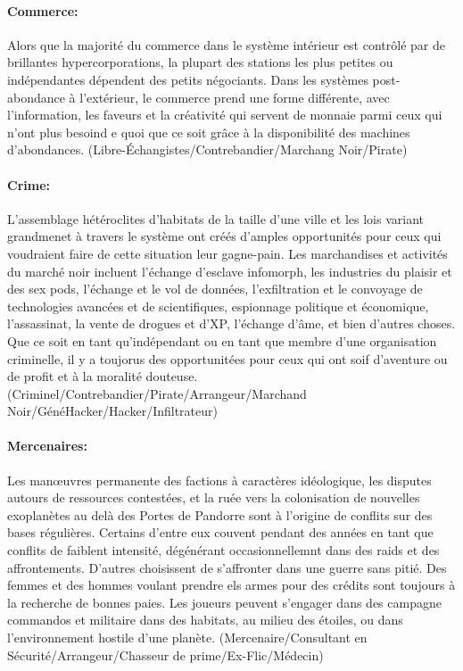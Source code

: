 \paragraph{Commerce:} Alors que la majorité du commerce dans le système intérieur est contrôlé par de brillantes hypercorporations, la plupart des stations les plus petites ou indépendantes dépendent des petits négociants. Dans les systèmes post-abondance à l'extérieur, le commerce prend une forme différente, avec l'information, les faveurs et la créativité qui servent de monnaie parmi ceux qui n'ont plus besoind e quoi que ce soit grâce à la disponibilité des machines d'abondances. (Libre-Échangistes/Contrebandier/Marchang Noir/Pirate) 

\paragraph{Crime:} L'assemblage hétéroclites d'habitats de la taille d'une ville et les lois variant grandmenet à travers le système ont créés d'amples opportunités pour ceux qui voudraient faire de cette situation leur gagne-pain. Les marchandises et activités du marché noir incluent l'échange d'esclave infomorph, les industries du plaisir et des sex pods, l'échange et le vol de données, l'exfiltration et le convoyage de technologies avancées et de scientifiques, espionnage politique et économique, l'assassinat, la vente de drogues et d'XP, l'échange d'âme, et bien d'autres choses. Que ce soit en tant qu'indépendant ou en tant que membre d'une organisation criminelle, il y a toujorus des opportunitées pour ceux qui ont soif d'aventure ou de profit et à la moralité douteuse. (Criminel/Contrebandier/Pirate/Arrangeur/Marchand Noir/GénéHacker/Hacker/Infiltrateur) 

\paragraph{Mercenaires:} Les manœuvres permanente des factions à caractères idéologique, les disputes autours de ressources contestées, et la ruée vers la colonisation de nouvelles exoplanètes au delà des Portes de Pandorre sont à l'origine de conflits sur des bases régulières. Certains d'entre eux couvent pendant des années en tant que conflits de faiblent intensité, dégénérant occasionnellemnt dans des raids et des affrontements. D'autres choisissent de s'affronter dans une guerre sans pitié. Des femmes et des hommes voulant prendre els armes pour des crédits sont toujours à la recherche de bonnes paies. Les joueurs peuvent s'engager dans des campagne commandos et militaire dans des habitats, au milieu des étoiles, ou dans l'environnement hostile d'une planète. (Mercenaire/Consultant en Sécurité/Arrangeur/Chasseur de prime/Ex-Flic/Médecin) 

